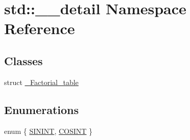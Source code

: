 \hypertarget{namespacestd_1_1____detail}{}\section{std\+:\+:\+\_\+\+\_\+detail Namespace Reference}
\label{namespacestd_1_1____detail}
\subsection*{Classes}
\begin{DoxyCompactItemize}
\item 
struct \hyperlink{structstd_1_1____detail_1_1__Factorial__table}{\+\_\+\+Factorial\+\_\+table}
\end{DoxyCompactItemize}
\subsection*{Enumerations}
\begin{DoxyCompactItemize}
\item 
enum \{ \hyperlink{namespacestd_1_1____detail_a354c633cb3e397eae4c31776b2d67923a0fef08e2967964a1421753c5d738c838}{S\+I\+N\+I\+N\+T}, 
\hyperlink{namespacestd_1_1____detail_a354c633cb3e397eae4c31776b2d67923a4b5ea0190e37e477a2874e231190489e}{C\+O\+S\+I\+N\+T}
 \}
\end{DoxyCompactItemize}
